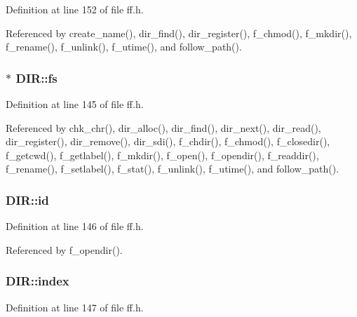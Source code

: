 Definition at line 152 of file ff.\+h.



Referenced by create\+\_\+name(), dir\+\_\+find(), dir\+\_\+register(), f\+\_\+chmod(), f\+\_\+mkdir(), f\+\_\+rename(), f\+\_\+unlink(), f\+\_\+utime(), and follow\+\_\+path().

\subsubsection[{\texorpdfstring{fs}{fs}}]{$\ast$ D\+I\+R\+::fs}\hypertarget{structDIR_a312eaa66cb703fb2993ea98173dc0c9a}{}\label{structDIR_a312eaa66cb703fb2993ea98173dc0c9a}


Definition at line 145 of file ff.\+h.



Referenced by chk\+\_\+chr(), dir\+\_\+alloc(), dir\+\_\+find(), dir\+\_\+next(), dir\+\_\+read(), dir\+\_\+register(), dir\+\_\+remove(), dir\+\_\+sdi(), f\+\_\+chdir(), f\+\_\+chmod(), f\+\_\+closedir(), f\+\_\+getcwd(), f\+\_\+getlabel(), f\+\_\+mkdir(), f\+\_\+open(), f\+\_\+opendir(), f\+\_\+readdir(), f\+\_\+rename(), f\+\_\+setlabel(), f\+\_\+stat(), f\+\_\+unlink(), f\+\_\+utime(), and follow\+\_\+path().

\subsubsection[{\texorpdfstring{id}{id}}]{ D\+I\+R\+::id}\hypertarget{structDIR_aca2c95a99a04173917ec70c030891383}{}\label{structDIR_aca2c95a99a04173917ec70c030891383}


Definition at line 146 of file ff.\+h.



Referenced by f\+\_\+opendir().

\subsubsection[{\texorpdfstring{index}{index}}]{ D\+I\+R\+::index}\hypertarget{structDIR_ab95119fbacbe45e3e9ee0f962b844092}{}\label{structDIR_ab95119fbacbe45e3e9ee0f962b844092}


Definition at line 147 of file ff.\+h.



